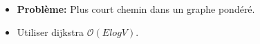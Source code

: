 \begin{frame}
    \frametitle{\problemtitle}
    \begin{itemize}
        \item<+-> \textbf{Problème:} Plus court chemin dans un graphe pondéré.
        \item<+-> Utiliser dijkstra $\mathcal O(E log V)$.
    \end{itemize}
\end{frame}
